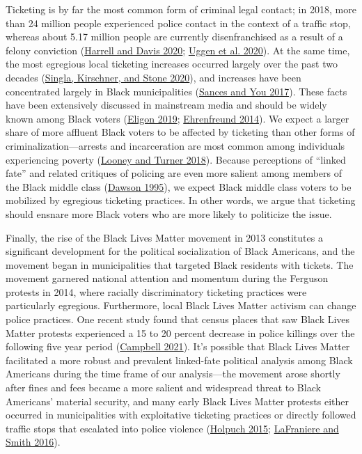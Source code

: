 \documentclass[
  12pt,
]{article}
\begin{document}
Ticketing is by far the most common form of criminal legal contact; in 2018, more than 24 million people experienced police contact in the context of a traffic stop, whereas about 5.17 million people are currently disenfranchised as a result of a felony conviction (\protect\hyperlink{ref-Harrell2020}{Harrell and Davis 2020}; \protect\hyperlink{ref-Uggen2020}{Uggen et al. 2020}). At the same time, the most egregious local ticketing increases occurred largely over the past two decades (\protect\hyperlink{ref-Singla2020}{Singla, Kirschner, and Stone 2020}), and increases have been concentrated largely in Black municipalities (\protect\hyperlink{ref-Sances2017}{Sances and You 2017}). These facts have been extensively discussed in mainstream media and should be widely known among Black voters (\protect\hyperlink{ref-Eligon2019}{Eligon 2019}; \protect\hyperlink{ref-Ehrenfreund2014}{Ehrenfreund 2014}). We expect a larger share of more affluent Black voters to be affected by ticketing than other forms of criminalization---arrests and incarceration are most common among individuals experiencing poverty (\protect\hyperlink{ref-Looney2018}{Looney and Turner 2018}). Because perceptions of ``linked fate'' and related critiques of policing are even more salient among members of the Black middle class (\protect\hyperlink{ref-Dawson1995}{Dawson 1995}), we expect Black middle class voters to be mobilized by egregious ticketing practices. In other words, we argue that ticketing should ensnare more Black voters who are more likely to politicize the issue.

Finally, the rise of the Black Lives Matter movement in 2013 constitutes a significant development for the political socialization of Black Americans, and the movement began in municipalities that targeted Black residents with tickets. The movement garnered national attention and momentum during the Ferguson protests in 2014, where racially discriminatory ticketing practices were particularly egregious. Furthermore, local Black Lives Matter activism can change police practices. One recent study found that census places that saw Black Lives Matter protests experienced a 15 to 20 percent decrease in police killings over the following five year period (\protect\hyperlink{ref-Campbell2021}{Campbell 2021}). It's possible that Black Lives Matter facilitated a more robust and prevalent linked-fate political analysis among Black Americans during the time frame of our analysis---the movement arose shortly after fines and fees became a more salient and widespread threat to Black Americans' material security, and many early Black Lives Matter protests either occurred in municipalities with exploitative ticketing practices or directly followed traffic stops that escalated into police violence (\protect\hyperlink{ref-Holpuch2015}{Holpuch 2015}; \protect\hyperlink{ref-LaFraniere2016}{LaFraniere and Smith 2016}).
\end{document}
